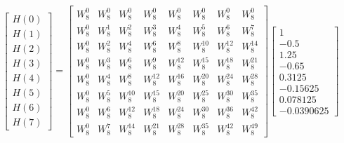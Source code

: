 \documentclass[journal,12pt,twocolumn]{IEEEtran}
\renewcommand\thesection{\arabic{section}}
\begin{document}
\begin{enumerate}[label=\thesection.\arabic*.,ref=\thesection.\theenumi]
\begin{equation}
\begin{bmatrix}
H(0) \\
H(1) \\
H(2) \\
H(3) \\
H(4) \\
H(5) \\
H(6) \\
H(7)
\end{bmatrix}
=
\begin{bmatrix}
W^{0}_{8} & W^{0}_{8} & W^{0}_{8} & W^{0}_{8} & W^{0}_{8} & W^{0}_{8} & W^{0}_{8} & W^{0}_{8}\\
W^{0}_{8} & W^{1}_{8} & W^{2}_{8} & W^{3}_{8} & W^{4}_{8} & W^{5}_{8} & W^{6}_{8} & W^{7}_{8}\\
W^{0}_{8} & W^{2}_{8} & W^{4}_{8} & W^{6}_{8} & W^{8}_{8} & W^{10}_{8} & W^{12}_{8} & W^{14}_{8}\\
W^{0}_{8} & W^{3}_{8} & W^{6}_{8} & W^{9}_{8} & W^{12}_{8} & W^{15}_{8} & W^{18}_{8} & W^{21}_{8}\\
W^{0}_{8} & W^{4}_{8} & W^{8}_{8} & W^{12}_{8} & W^{16}_{8} & W^{20}_{8} & W^{24}_{8} & W^{28}_{8}\\
W^{0}_{8} & W^{5}_{8} & W^{10}_{8} & W^{15}_{8} & W^{20}_{8} & W^{25}_{8} & W^{30}_{8} & W^{35}_{8}\\
W^{0}_{8} & W^{6}_{8} & W^{12}_{8} & W^{18}_{8} & W^{24}_{8} & W^{30}_{8} & W^{36}_{8} & W^{42}_{8}\\
W^{0}_{8} & W^{7}_{8} & W^{14}_{8} & W^{21}_{8} & W^{28}_{8} & W^{35}_{8} & W^{42}_{8} & W^{49}_{8}
\end{bmatrix}
\begin{bmatrix}
1 \\
-0.5 \\
1.25 \\
-0.65 \\
0.3125 \\
-0.15625 \\
0.078125 \\
-0.0390625
\end{bmatrix}
\end{equation}




\end{enumerate}
\end{document}
